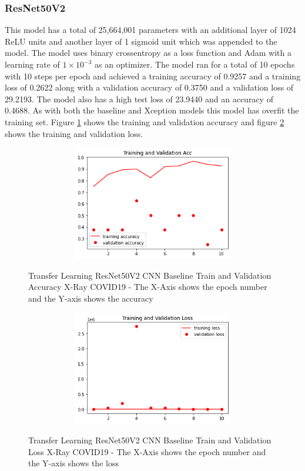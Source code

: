 \subsubsection{ResNet50V2}
This model has a total of 25,664,001 parameters with an additional layer of 1024 ReLU units and another layer of 1 sigmoid unit which was appended to the model.  The model uses binary crossentropy as a loss function and Adam with a learning rate of $1\times10^{-3}$ as an optimizer.  The model ran for a total of 10 epochs with 10 steps per epoch and achieved a training accuracy of 0.9257 and a training loss of 0.2622 along with a validation accuracy of 0.3750 and a validation loss of 29.2193.  The model also has a high test loss of 23.9440 and an accuracy of 0.4688.  As with both the baseline and Xception models this model has overfit the training set. Figure \ref{fig:ResNet50V2 CNN Baseline Train and Validation Accuracy X-Ray COVID19} shows the training and validation accuracy and figure \ref{fig:ResNet50V2 CNN Baseline Train and Validation Loss X-Ray COVID19} shows the training and validation loss.
 \begin{figure}[H]
    \centering
    \includegraphics[width=1\textwidth,height=5cm,keepaspectratio]{Images/ResNet50V2BaselineTrainingValidationAccuracyXRayCOVID19.png}\\
    \caption{Transfer Learning ResNet50V2 CNN Baseline Train and Validation Accuracy X-Ray COVID19 - The X-Axis shows the epoch number and the Y-axis shows the accuracy}
    \label{fig:ResNet50V2 CNN Baseline Train and Validation Accuracy X-Ray COVID19}
\end{figure}
 \begin{figure}[H]
    \centering
    \includegraphics[width=1\textwidth,height=5cm,keepaspectratio]{Images/ResNet50V2BaselineTrainingValidationLossXRayCOVID19.png}\\
    \caption{Transfer Learning ResNet50V2 CNN Baseline Train and Validation Loss X-Ray COVID19 - The X-Axis shows the epoch number and the Y-axis shows the loss}
    \label{fig:ResNet50V2 CNN Baseline Train and Validation Loss X-Ray COVID19}
\end{figure}
